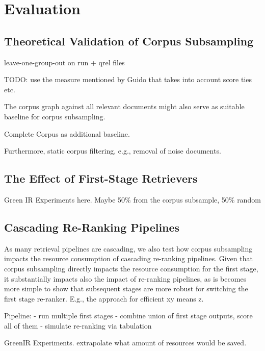 \section{Evaluation}

\subsection{Theoretical Validation of Corpus Subsampling}

leave-one-group-out on run + qrel files



{\color{red} TODO: use the measure mentioned by Guido that takes into account score ties etc.

The corpus graph against all relevant documents might also serve as suitable baseline for corpus subsampling.

Complete Corpus as additional baseline.


Furthermore, static corpus filtering, e.g., removal of noise documents.
}

\subsection{The Effect of First-Stage Retrievers}

Green IR Experiments here.
Maybe 50\% from the corpus subsample, 50\% random

\subsection{Cascading Re-Ranking Pipelines}

As many retrieval pipelines are cascading, we also test how corpus subsampling impacts the resource consumption of cascading re-ranking pipelines. Given that corpus subsampling directly impacts the resource consumption for the first stage, it substantially impacts also the impact of re-ranking pipelines, as is becomes more simple to show that subsequent stages are more robust for switching the first stage re-ranker. E.g., the approach for efficient xy means z.

Pipeline:
- run multiple first stages
- combine union of first stage outputs, score all of them
- simulate re-ranking via tabulation

{\color{red} GreenIR Experiments. extrapolate what amount of resources would be saved.}
